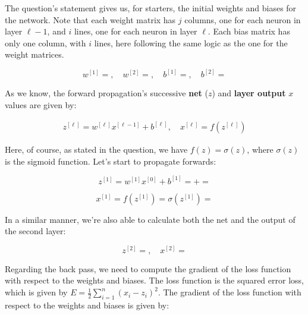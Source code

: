 \documentclass[12pt]{article}
\begin{document}
\begin{enumerate}[leftmargin=\labelsep]
  The question's statement gives us, for starters, the initial weights and biases
  for the network. Note that each weight matrix has $j$ columns, one for each neuron
  in layer $\ell - 1$, and $i$ lines, one for each neuron in layer $\ell$. Each
  bias matrix has only one column, with $i$ lines, here following the same logic
  as the one for the weight matrices.

  \begin{equation*}
    w^{[1]} = , \quad
    w^{[2]} = , \quad
    b^{[1]} = , \quad
    b^{[2]} = 
  \end{equation*}

  As we know, the forward propagation's successive \textbf{net} ($z$) and \textbf{layer output} $x$
  values are given by:

  \begin{equation*}
    \begin{aligned}
      z^{[\ell]} = w^{[\ell]} x^{[\ell-1]} + b^{[\ell]}, \quad
      x^{[\ell]} = f(z^{[\ell]})
    \end{aligned}
  \end{equation*}

  Here, of course, as stated in the question, we have $f(z) = \sigma(z)$, where $\sigma(z)$ is the
  sigmoid function. Let's start to propagate forwards:

  \begin{equation*}
    z^{[1]} = w^{[1]} x^{[0]} + b^{[1]}
    =   + 
    = 
  \end{equation*}

  \begin{equation*}
    x^{[1]} = f(z^{[1]}) = \sigma(z^{[1]}) = 
  \end{equation*}

  In a similar manner, we're also able to calculate both the net and the output
  of the second layer:

  \begin{equation*}
    z^{[2]} = , \quad x^{[2]} = 
  \end{equation*}

  Regarding the back pass, we need to compute the gradient of the loss function with respect to
  the weights and biases. The loss function is the squared error loss, which is given by
  $E = \frac{1}{2} \sum_{i=1}^n (x_i - z_i)^2$.
  The gradient of the loss function with respect to the weights and biases is given by:


\end{enumerate}
\end{document}
